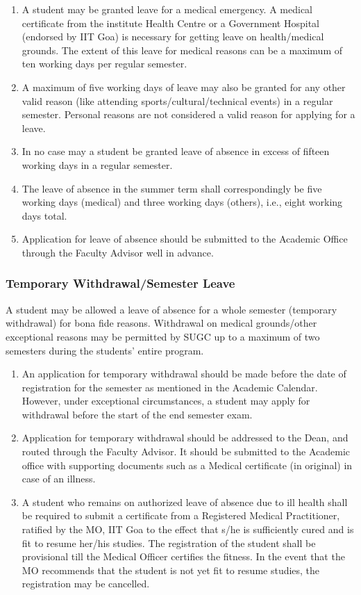 \begin{enumerate}
    \item A student may be granted leave for a medical emergency. A medical certificate from the institute Health Centre or a Government Hospital (endorsed by IIT Goa) is necessary for getting leave on health/medical grounds. The extent of this leave for medical reasons can be a maximum of ten working days per regular semester. 
    \item A maximum of five working days of leave may also be granted for any other valid reason (like attending sports/cultural/technical events) in a regular semester. Personal reasons are not considered a valid reason for applying for a leave.
    \item In no case may a student be granted leave of absence in excess of fifteen working days in a regular semester. 
    \item The leave of absence in the summer term shall correspondingly be five working days (medical) and three working days (others), i.e., eight working days total. 
    \item Application for leave of absence should be submitted to the Academic Office through the Faculty Advisor well in advance.
\end{enumerate}

\subsubsection{Temporary Withdrawal/Semester Leave}

 A student may be allowed a leave of absence for a whole semester (temporary withdrawal) for bona fide reasons. Withdrawal on medical grounds/other exceptional reasons may be permitted by SUGC up to a maximum of two semesters during the students' entire program.

\begin{enumerate}
    \item An application for temporary withdrawal should be made before the date of registration for the semester as mentioned in the Academic Calendar. However, under exceptional circumstances, a student may apply for withdrawal before the start of the end semester exam.
    \item Application for temporary withdrawal should be addressed to the Dean, and routed through the Faculty Advisor. It should be submitted to the Academic office with supporting documents such as a Medical certificate (in original) in case of an illness. 
    \item A student who remains on authorized leave of absence due to ill health shall be required to submit a certificate from a Registered Medical Practitioner, ratified by the MO, IIT Goa to the effect that s/he is sufficiently cured and is fit to resume her/his studies. The registration of the student shall be provisional till the Medical Officer certifies the fitness. In the event that the MO recommends that the student is not yet fit to resume studies, the registration may be cancelled.
\end{enumerate}

